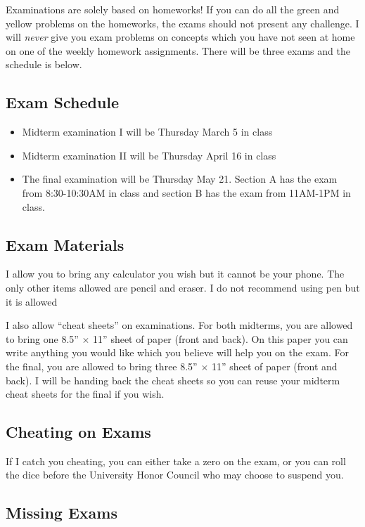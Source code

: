 \documentclass[12pt]{article}
\newcommand{\qu}[1]{``#1''}
\begin{document}
Examinations are solely based on homeworks! If you can do all the green and yellow problems on the homeworks, the exams should not present any challenge. I will \textit{never} give you exam problems on concepts which you have not seen at home on one of the weekly homework assignments. There will be three exams and the schedule is below.

\subsection*{Exam Schedule}\label{subsec:exam_schedule}

\begin{itemize}
\itemsep -0.0em 
\item Midterm examination I will be Thursday March 5 in class
\item Midterm examination II will be Thursday April 16 in class
\item The final examination will be Thursday May 21. Section A has the exam from 8:30-10:30AM in class and section B has the exam from 11AM-1PM in class.
\end{itemize}

\subsection*{Exam Materials}

I allow you to bring any calculator you wish but it cannot be your phone. The only other items allowed are pencil and eraser. I do not recommend using pen but it is allowed

I also allow \qu{cheat sheets} on examinations. For both midterms, you are allowed to bring one 8.5'' $\times$ 11'' sheet of paper (front and back). On this paper you can write anything you would like which you believe will help you on the exam. For the final, you are allowed to bring three 8.5'' $\times$ 11'' sheet of paper (front and back). I will be handing back the cheat sheets so you can reuse your midterm cheat sheets for the final if you wish. 


\subsection*{Cheating on Exams}

If I catch you cheating, you can either take a zero on the exam, or you can roll the dice before the University Honor Council who may choose to suspend you.


\subsection*{Missing Exams}
\end{document}
